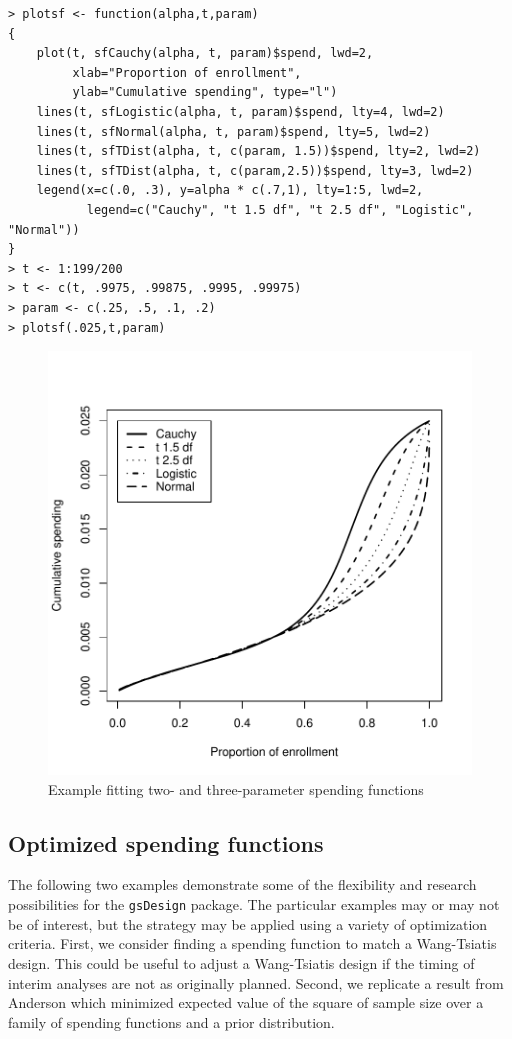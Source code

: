 \bigskip

\begin{verbatim}
> plotsf <- function(alpha,t,param)
{
    plot(t, sfCauchy(alpha, t, param)$spend, lwd=2,
         xlab="Proportion of enrollment",
         ylab="Cumulative spending", type="l")
    lines(t, sfLogistic(alpha, t, param)$spend, lty=4, lwd=2)
    lines(t, sfNormal(alpha, t, param)$spend, lty=5, lwd=2)
    lines(t, sfTDist(alpha, t, c(param, 1.5))$spend, lty=2, lwd=2)
    lines(t, sfTDist(alpha, t, c(param,2.5))$spend, lty=3, lwd=2)
    legend(x=c(.0, .3), y=alpha * c(.7,1), lty=1:5, lwd=2,
           legend=c("Cauchy", "t 1.5 df", "t 2.5 df", "Logistic", "Normal"))
}
> t <- 1:199/200
> t <- c(t, .9975, .99875, .9995, .99975)
> param <- c(.25, .5, .1, .2)
> plotsf(.025,t,param)
\end{verbatim}

\begin{center}%
\begin{figure}
\begin{center}
\includegraphics[width=.6\textwidth]{figs/sfLogistic.pdf}
\end{center}
\caption{Example fitting two- and three-parameter spending functions}
\end{figure}%

\end{center}

\subsection{Optimized spending functions}

The following two examples demonstrate some of the flexibility and research
possibilities for the \texttt{gsDesign} package. The particular examples may or may not
be of interest, but the strategy may be applied using a variety of
optimization criteria. First, we consider finding a spending function to match
a Wang-Tsiatis design. This could be useful to adjust a Wang-Tsiatis design if
the timing of interim analyses are not as originally planned. Second, we
replicate a result from Anderson \cite{AndBMJ} which minimized expected value
of the square of sample size over a family of spending functions and a prior distribution.

